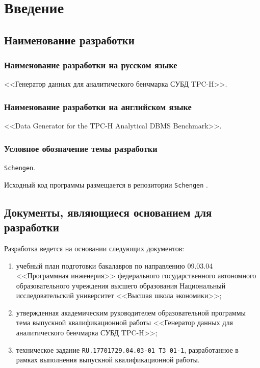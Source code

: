 \section{Введение}

\subsection{Наименование разработки}

\subsubsection{Наименование разработки на русском языке}

<<Генератор данных для аналитического бенчмарка СУБД TPC-H>>.

\subsubsection{Наименование разработки на английском языке}

<<Data Generator for the TPC-H Analytical DBMS Benchmark>>.

\subsubsection{Условное обозначение темы разработки}

\texttt{Schengen}.

Исходный код программы размещается в репозитории \texttt{Schengen}
.

\subsection{Документы, являющиеся основанием для разработки}

Разработка ведется на основании следующих документов:
\begin{enumerate}
    \item учебный план подготовки бакалавров по направлению 09.03.04
    <<Программная инженерия>> федерального государственного автономного
    образовательного учреждения высшего образования Национальный
    исследовательский университет <<Высшая школа экономики>>;
    \item утвержденная академическим руководителем образовательной программы
    тема выпускной квалификационной работы <<Генератор данных для аналитического
    бенчмарка СУБД TPC-H>>;
    \item техническое задание \texttt{RU.17701729.04.03-01 ТЗ 01-1},
    разработанное в рамках выполнения выпускной квалификационной работы.
\end{enumerate}

